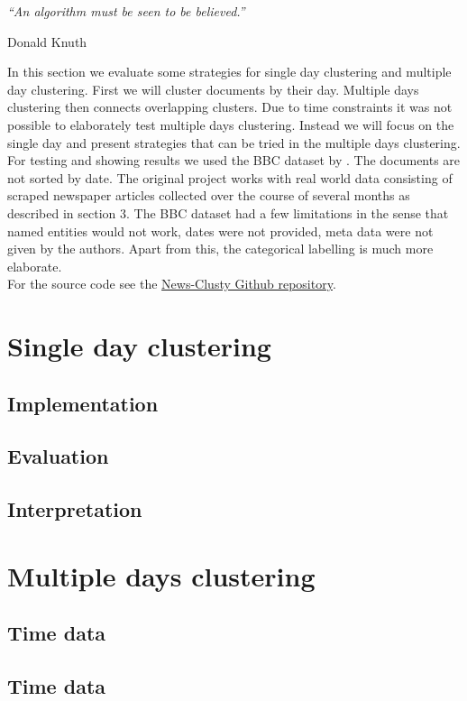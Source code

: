 \epigraph{\emph{
  ``An algorithm must be seen to be believed.''
}}{ Donald Knuth }

In this section we evaluate some strategies for single day clustering and multiple day clustering. First we will cluster documents by their day. Multiple days clustering then connects overlapping clusters. Due to time constraints it was not possible to elaborately test multiple days clustering. Instead we will focus on the single day and present strategies that can be tried in the multiple days clustering.\\
For testing and showing results we used the BBC dataset by \cite{BBCData2006}. The documents are not sorted by date. The original project works with real world data consisting of scraped newspaper articles collected over the course of several months as described in section 3. The BBC dataset had a few limitations in the sense that named entities would not work, dates were not provided, meta data were not given by the authors. Apart from this, the categorical labelling is much more elaborate.\\
For the source code see the \href{https://github.com/sacry-/text-mining-haw-bachelor/}{News-Clusty Github repository}.

\section{Single day clustering}
  \subsection{Implementation}
  \subsection{Evaluation}
  \subsection{Interpretation}

\section{Multiple days clustering}
  \subsection{Time data}
  \subsection{Time data}

